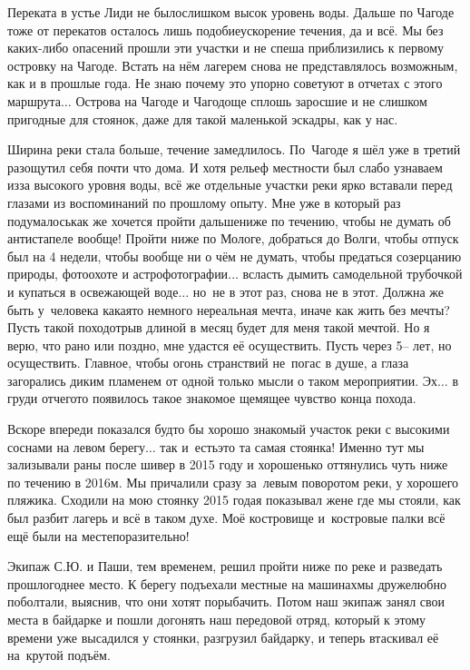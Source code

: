 Переката в устье Лиди не было\mdash слишком высок уровень воды. Дальше по Чагоде тоже от перекатов осталось лишь подобие\mdash ускорение течения, да и всё. Мы без каких-либо опасений прошли эти участки и не спеша приблизились к первому островку на Чагоде. Встать на нём лагерем снова не представлялось возможным, как и в прошлые года. Не знаю почему это упорно советуют в отчетах с этого маршрута$\ldots$ Острова на Чагоде и Чагодоще сплошь заросшие и не слишком пригодные для стоянок, даже для такой маленькой эскадры, как у нас.

Ширина реки стала больше, течение замедлилось. По~Чагоде я шёл уже в третий раз\mdash ощутил себя почти что дома. И хотя рельеф местности был слабо узнаваем из\sdash за высокого уровня воды, всё же отдельные участки реки ярко вставали перед глазами из воспоминаний по прошлому опыту. Мне уже в который раз подумалось\mdash как же хочется пройти дальше\mdash ниже по течению, чтобы не думать об антистапеле вообще! Пройти ниже по Мологе, добраться до Волги, чтобы отпуск был на 4 недели, чтобы вообще ни о чём не думать, чтобы предаться созерцанию природы, фотоохоте и астрофотографии$\ldots$ всласть дымить самодельной трубочкой и купаться в освежающей воде$\ldots$ но~не в этот раз, снова не в этот. Должна же быть у~человека какая\sdash то немного нереальная мечта, иначе как жить без мечты? Пусть такой поход\sdash отрыв длиной в месяц будет для меня такой мечтой. Но я верю, что рано или поздно, мне удастся её осуществить. Пусть через 5\thinspace\nobreakdash-- лет, но осуществить. Главное, чтобы огонь странствий не~погас в душе, а глаза загорались диким пламенем от одной только мысли о таком мероприятии. Эх$\ldots$ в груди отчего\sdash то появилось такое знакомое щемящее чувство конца похода. 

Вскоре впереди показался будто бы хорошо знакомый участок реки с высокими соснами на левом берегу$\ldots$ так и~есть\mdash это та самая стоянка! Именно тут мы зализывали раны после шивер в 2015 году и хорошенько оттянулись чуть ниже по течению в 2016\sdash м. Мы причалили сразу за~левым поворотом реки, у хорошего пляжика. Сходили на мою стоянку 2015 года\mdash я показывал жене где мы стояли, как был разбит лагерь и всё в таком духе. Моё костровище и~костровые палки всё ещё были на месте\mdash поразительно! 

Экипаж С.Ю. и Паши, тем временем, решил пройти ниже по реке и разведать прошлогоднее место. К берегу подъехали местные на машинах\mdash мы дружелюбно поболтали, выяснив, что они хотят порыбачить. Потом наш экипаж занял свои места в байдарке и пошли догонять наш передовой отряд, который к этому времени уже высадился у стоянки, разгрузил байдарку, и теперь втаскивал её на~крутой подъём. 

